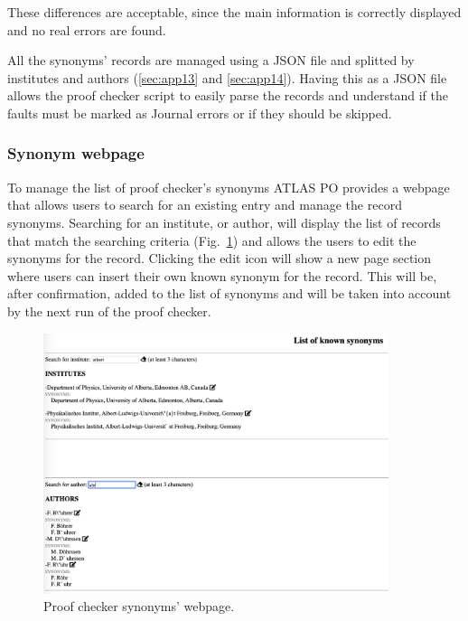These differences are acceptable, since the main information is correctly displayed and no real errors are found.

All the synonyms’ records are managed using a JSON file and splitted by institutes and authors (\ref{sec:app13} and \ref{sec:app14}). Having this as a JSON file allows the proof checker script to easily parse the records and understand if the faults must be marked as Journal errors or if they should be skipped.

\subsubsection{Synonym webpage}
\label{sec:Synonym_webpage}
To manage the list of proof checker’s synonyms ATLAS PO provides a webpage that allows users to search for an existing entry and manage the record synonyms. 
Searching for an institute, or author, will display the list of records that match the searching criteria (Fig.~\ref{fig:synonym_webpage}) and allows the users to edit the synonyms for the record.
Clicking the edit icon will show a new page section where users can insert their own known synonym for the record. This will be, after confirmation, added to the list of synonyms and will be taken into account by the next run of the proof checker.
\begin{figure}[ht!]
  \centering
  \includegraphics[width=0.9\textwidth]{figures/synonym_webpage.png}
  \caption{Proof checker synonyms’ webpage.}
  \label{fig:synonym_webpage}
\end{figure}

